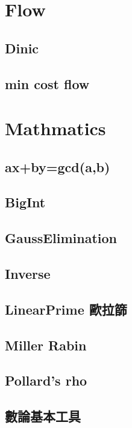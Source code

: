 \section{Flow}

\subsection{Dinic}

\subsection{min cost flow}


\section{Mathmatics}

\subsection{ax+by=gcd(a,b)}

\subsection{BigInt}

\subsection{GaussElimination}

\subsection{Inverse}

\subsection{LinearPrime 歐拉篩}

\subsection{Miller Rabin}

\subsection{Pollard's rho}

\subsection{數論基本工具}

